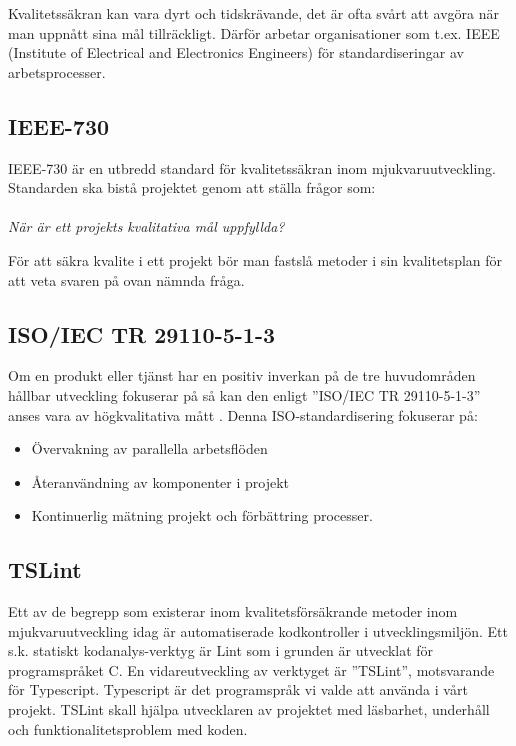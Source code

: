 Kvalitetssäkran kan vara dyrt och tidskrävande, det är ofta svårt att avgöra när man uppnått sina mål tillräckligt\cite{lighthouse}.
Därför arbetar organisationer som t.ex. IEEE (Institute of Electrical and Electronics Engineers) för standardiseringar av arbetsprocesser.

\subsection{IEEE-730}

IEEE-730 är en utbredd standard för kvalitetssäkran inom mjukvaruutveckling. Standarden ska bistå projektet genom att ställa frågor som:
\\ \\
\emph{När är ett projekts kvalitativa mål uppfyllda?}

För att säkra kvalite i ett projekt bör man fastslå metoder i sin kvalitetsplan för att veta svaren på ovan nämnda fråga. \\

\subsection{ISO/IEC TR 29110-5-1-3}
Om en produkt eller tjänst har en positiv inverkan på de tre huvudområden hållbar utveckling fokuserar på så kan den enligt ”ISO/IEC TR 29110-5-1-3” anses vara av högkvalitativa mått \cite{ISOtor}. Denna ISO-standardisering fokuserar på: 

\begin{itemize}
	\item Övervakning av parallella arbetsflöden
	\item Återanvändning av komponenter i projekt
	\item Kontinuerlig mätning projekt och förbättring processer.
\end{itemize}


\subsection{TSLint}
Ett av de begrepp som existerar inom kvalitetsförsäkrande metoder inom mjukvaruutveckling idag är automatiserade kodkontroller i utvecklingsmiljön.
Ett s.k. statiskt kodanalys-verktyg är Lint som i grunden är utvecklat för programspråket C. En vidareutveckling av verktyget är ”TSLint”, motsvarande för Typescript. Typescript är det programspråk vi valde att använda i vårt projekt. TSLint skall hjälpa utvecklaren av projektet med läsbarhet, underhåll och funktionalitetsproblem med koden.

